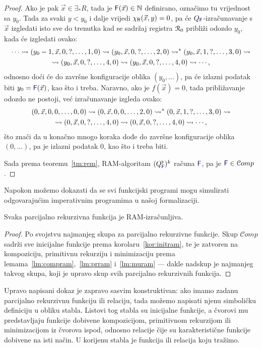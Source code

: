 \begin{proof}
Ako je pak $\vec x\in\exists_*R$, tada je $\f F(\vec x)\in\N$ definirano, označimo tu vrijednost sa $y_0$. Tada za svaki $y<y_0$ i dalje vrijedi $\chi_{\f R}(\vec x,y)=0$, pa će $Q_{\f F}$-izračunavanje s $\vec x$ izgledati isto sve do trenutka kad se sadržaj registra $\mathcal R_{0}$ približi odozdo $y_0$, kada će izgledati ovako:
\begin{multline}
    \dotsb\leadsto(y_0-1,\vec x,0,?,\dotsc,1,0)\leadsto
    (y_0,\vec x,0,?,\dotsc,2,0)\leadsto^*
    (y_0,\vec x,1,?,\dotsc,3,0)\leadsto\\
    \leadsto(y_0,\vec x,0,?,\dotsc,4,0)\leadsto
    (y_0,\vec x,0,?,\dotsc,4,0)\leadsto\dotsb\text,
\end{multline}
odnosno doći će do završne konfiguracije oblika $(y_0,\dotsc)$, pa će izlazni podatak biti $y_0=\f F(\vec x)$, kao što i treba. Naravno, ako je $f(\vec x)=0$, tada približavanje odozdo ne postoji, već izračunavanje izgleda ovako:
\begin{multline}
    (0,\vec x,0,0,\dotsc,0,0)\leadsto
    (0,\vec x,0,0,\dotsc,2,0)\leadsto^*
    (0,\vec x,1,?,\dotsc,3,0)\leadsto\\
    \leadsto(0,\vec x,0,?,\dotsc,4,0)
    \leadsto(0,\vec x,0,?,\dotsc,4,0)\leadsto\dotsb\text,
\end{multline}
što znači da u konačno mnogo koraka dođe do završne konfiguracije oblika $(0,\dotsc)$, pa je izlazni podatak $0$, kao što i treba biti.

Sada prema teoremu~\ref{tm:rem}, RAM-algoritam $(Q_{\f F}^\flat)^k$ računa $\f F$, pa je $\f F\in\mathcal Comp$.
\end{proof}

Napokon možemo dokazati da se svi funkcijski programi mogu simulirati odgovarajućim imperativnim programima u našoj formalizaciji.

\begin{teorem}\label{tm:pir}
Svaka parcijalno rekurzivna funkcija je RAM-izračunljiva.
\end{teorem}
\begin{proof}
Po svojstvu najmanjeg skupa za parcijalno rekurzivne funkcije. Skup $\mathcal Comp$ sadrži sve inicijalne funkcije prema korolaru~\ref{kor:initram}, te je zatvoren na kompoziciju, primitivnu rekurziju i minimizaciju prema lemama~\ref{lm:compram},~\ref{lm:prram} i~\ref{lm:muram} --- dakle nadskup je najmanjeg takvog skupa, koji je upravo skup svih parcijalno rekurzivnih funkcija.
\end{proof}

Upravo napisani dokaz je zapravo sasvim konstruktivan: ako imamo zadanu parcijalno rekurzivnu funkciju ili relaciju, tada možemo napisati njenu simboličku definiciju u obliku stabla. Listovi tog stabla su inicijalne funkcije, a čvorovi mu predstavljaju funkcije dobivene kompozicijom, primitivnom rekurzijom ili minimizacijom iz čvorova ispod, odnosno relacije čije su karakteristične funkcije dobivene na isti način. U korijenu stabla je funkcija ili relacija koju tražimo.

